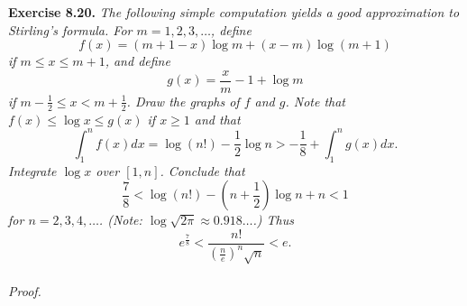 \documentclass{article}
\begin{document}
\textbf{Exercise 8.20.}
\emph{The following simple computation yields a good approximation to
Stirling's formula.
For $m=1,2,3,\ldots$, define
\[
  f(x) = (m+1-x) \log m + (x-m) \log(m+1)
\]
if $m \leq x \leq m+1$, and define
\[
  g(x) = \frac{x}{m} - 1 + \log m
\]
if $m - \frac{1}{2} \leq x < m + \frac{1}{2}$.
Draw the graphs of $f$ and $g$.
Note that $f(x) \leq \log x \leq g(x)$ if $x \geq 1$ and that
\[
  \int_{1}^{n} f(x)dx = \log(n!) - \frac{1}{2} \log n > -\frac{1}{8} + \int_{1}^{n} g(x)dx.
\]
Integrate $\log x$ over $[1,n]$.
Conclude that
\[
  \frac{7}{8} < \log(n!) - \left(n+\frac{1}{2}\right) \log n + n < 1
\]
for $n=2,3,4,\ldots$.
(Note: $\log \sqrt{2\pi} \approx 0.918\ldots$.)
Thus
\[
  e^{\frac{7}{8}} < \frac{n!}{(\frac{n}{e})^n \sqrt{n}} < e.
\]} \\

\emph{Proof.}
\end{document}
